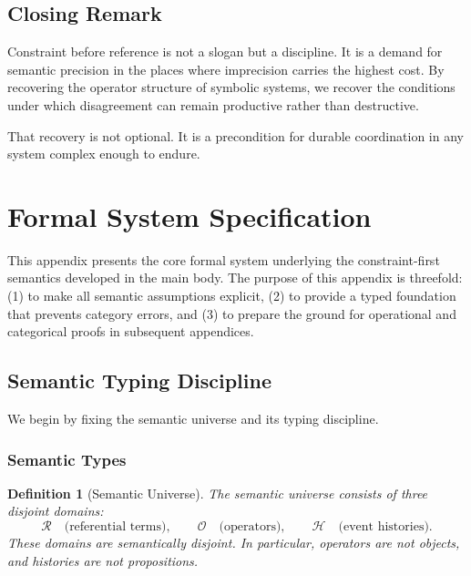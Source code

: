 \documentclass[11pt]{article}
\newtheorem{definition}{Definition}
\begin{document}
\subsection{Closing Remark}

Constraint before reference is not a slogan but a discipline. It is a demand for
semantic precision in the places where imprecision carries the highest cost. By
recovering the operator structure of symbolic systems, we recover the conditions
under which disagreement can remain productive rather than destructive.

That recovery is not optional. It is a precondition for durable coordination in
any system complex enough to endure.

\newpage
\appendix
\section{Formal System Specification}

This appendix presents the core formal system underlying the constraint-first
semantics developed in the main body. The purpose of this appendix is threefold:
(1) to make all semantic assumptions explicit, (2) to provide a typed foundation
that prevents category errors, and (3) to prepare the ground for operational and
categorical proofs in subsequent appendices.

\subsection{Semantic Typing Discipline}

We begin by fixing the semantic universe and its typing discipline.

\subsubsection{Semantic Types}

\begin{definition}[Semantic Universe]
The semantic universe consists of three disjoint domains:
\[
\mathcal{R} \quad \text{(referential terms)}, \qquad
\mathcal{O} \quad \text{(operators)}, \qquad
\mathcal{H} \quad \text{(event histories)}.
\]
These domains are semantically disjoint. In particular, operators are not
objects, and histories are not propositions.
\end{definition}
\end{document}
